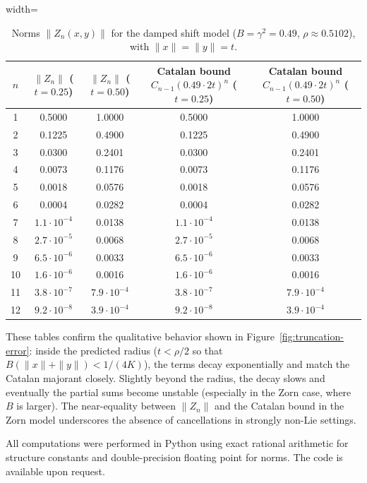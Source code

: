 \documentclass[11pt]{amsart}
\numberwithin{equation}{section}
\theoremstyle{remark}
\begin{document}
\begin{table}[h!]
\centering
\caption{Norms $\|Z_n(x,y)\|$ for the damped shift model ($B = \gamma^2 = 0.49$, $\rho \approx 0.5102$), with $\|x\| = \|y\| = t$.}
\label{tab:damped-numerics}
\begin{adjustbox}{width=\textwidth}\begin{tabular}{c c c c c}
\toprule
$n$ & $\|Z_n\|$ ($t=0.25$) & $\|Z_n\|$ ($t=0.50$) & Catalan bound $C_{n-1}(0.49\cdot 2t)^n$ ($t=0.25$) & Catalan bound $C_{n-1}(0.49\cdot 2t)^n$ ($t=0.50$) \\
\midrule
1 & 0.5000 & 1.0000 & 0.5000 & 1.0000 \\
2 & 0.1225 & 0.4900 & 0.1225 & 0.4900 \\
3 & 0.0300 & 0.2401 & 0.0300 & 0.2401 \\
4 & 0.0073 & 0.1176 & 0.0073 & 0.1176 \\
5 & 0.0018 & 0.0576 & 0.0018 & 0.0576 \\
6 & 0.0004 & 0.0282 & 0.0004 & 0.0282 \\
7 & $1.1\cdot10^{-4}$ & 0.0138 & $1.1\cdot10^{-4}$ & 0.0138 \\
8 & $2.7\cdot10^{-5}$ & 0.0068 & $2.7\cdot10^{-5}$ & 0.0068 \\
9 & $6.5\cdot10^{-6}$ & 0.0033 & $6.5\cdot10^{-6}$ & 0.0033 \\
10& $1.6\cdot10^{-6}$ & 0.0016 & $1.6\cdot10^{-6}$ & 0.0016 \\
11& $3.8\cdot10^{-7}$ & $7.9\cdot10^{-4}$ & $3.8\cdot10^{-7}$ & $7.9\cdot10^{-4}$ \\
12& $9.2\cdot10^{-8}$ & $3.9\cdot10^{-4}$ & $9.2\cdot10^{-8}$ & $3.9\cdot10^{-4}$ \\
\bottomrule
\end{tabular}\end{adjustbox}
\end{table}

These tables confirm the qualitative behavior shown in Figure~\ref{fig:truncation-error}: inside the predicted radius ($t < \rho/2$ so that $B(\|x\|+\|y\|) < 1/(4K)$), the terms decay exponentially and match the Catalan majorant closely. Slightly beyond the radius, the decay slows and eventually the partial sums become unstable (especially in the Zorn case, where $B$ is larger). The near-equality between $\|Z_n\|$ and the Catalan bound in the Zorn model underscores the absence of cancellations in strongly non-Lie settings.

All computations were performed in Python using exact rational arithmetic for structure constants and double-precision floating point for norms. The code is available upon request.
\end{document}
